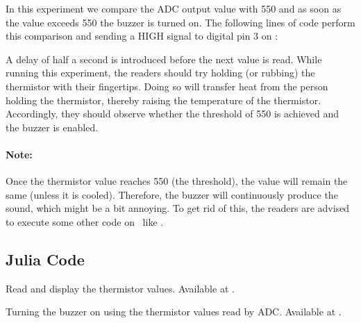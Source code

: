 \begin{enumerate}
        In this experiment we compare the ADC output value with 550
        and as soon as the value exceeds 550 the buzzer is turned on. The following lines of code perform this
        comparison and sending a {HIGH} signal to digital pin 3 on \arduino:
        
        A delay of half a second is introduced
        before the next value is read. While running this experiment,
        the readers should try holding (or rubbing) the thermistor with their fingertips.
        Doing so will transfer heat from the person holding the
        thermistor, thereby raising the temperature of the thermistor.
        Accordingly, they should observe whether the threshold of 550 is achieved
        and the buzzer is enabled.

        \paragraph{Note:} Once the thermistor value reaches 550 (the threshold), the value will remain the same
        (unless it is cooled). Therefore, the buzzer will continuously produce the sound, which might be
        a bit annoying. To get rid of this, the readers are advised to
        execute some other code on \arduino\ like .

\end{enumerate}

\subsection{Julia Code}
\label{sec:therm-julia-code}

\begin{juliacode}
   {Read and display
    the thermistor values. Available at
    .}
  \label{julia:therm-read}
  
\end{juliacode}

\begin{juliacode}
  {Turning the buzzer on using the thermistor values read by
    ADC.  Available at .}
  \label{julia:therm-buzzer}
  
\end{juliacode}

